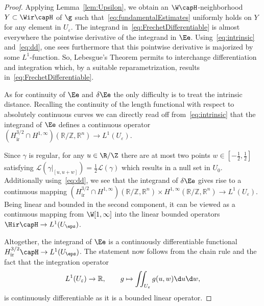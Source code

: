 \begin{proof}
Applying Lemma~\ref{lem:Upsilon}, we obtain an $\W \capH$-neighborhood $Y \subset \Wir \capH$ of $\g$
such that~\eqref{eq:fundamentalEstimates} uniformly holds on $Y$ for any element in $U_\varepsilon$.
The integrand in~\eqref{eq:FrechetDifferentiable} is almost everywhere
the pointwise derivative of the integrand in $\Ee$. Using~\eqref{eq:intrinsic} and~\eqref{eq:dd}, one sees
furthermore that this pointwise derivative is majorized by some $L^1$-function. So,
Lebesgue's Theorem permits to interchange differentiation and integration which,
by a suitable reparametrization, results in~\eqref{eq:FrechetDifferentiable}.

As for continuity of $\Ee$ and $\delta\Ee$ the only difficulty is to treat the intrinsic distance.
Recalling the continuity of the length functional with respect to absolutely continuous curves
we can directly read off from~\eqref{eq:intrinsic} that
the integrand of $\Ee$ defines a continuous operator
$(H_{\mathrm{ir}}^{3/2}\cap H^{1,\infty})(\mathbb R / \mathbb Z, \mathbb R^n) \to L^1(U_{\varepsilon})$.

Since $\gamma$ is regular, for any $u\in\R/\Z$ there are at most two points $w\in[-\tfrac12,\tfrac12]$ satisfying
$\mathscr L(\gamma|_{[u,u+w]}) = \tfrac 1 2 \mathscr L(\gamma)$ which results in a null set in $U_0$.
Additionally using~\eqref{eq:dd}, we see that the integrand of $\delta\Ee$ gives rise to a continuous mapping
$(H_{\mathrm{ir}}^{3/2}\cap H^{1,\infty})(\mathbb R / \mathbb Z, \mathbb R^n) \times H^{1,\infty} (\mathbb R / \mathbb Z, \mathbb R^n)
\to L^1(U_{\varepsilon})$.
Being linear and bounded in the second component, it can be viewed as a continuous mapping from $\W[1,\infty]$
into the linear bounded operators $\Hir\capH\to L^1(U_\eps)$.

Altogether, the integrand of $\Ee$ is a continuously differentiable functional 
$H_{\mathrm{ir}}^{3/2}\capH\to L^1(U_\eps)$.
The statement now follows from the chain rule and the fact that the integration operator
\[ L^1(U_\varepsilon) \to \mathbb R, \qquad
 g \mapsto \iint_{U_\varepsilon} g(u,w) \d u\d w, \]
is continuously differentiable as it is a bounded linear operator.
\end{proof}

